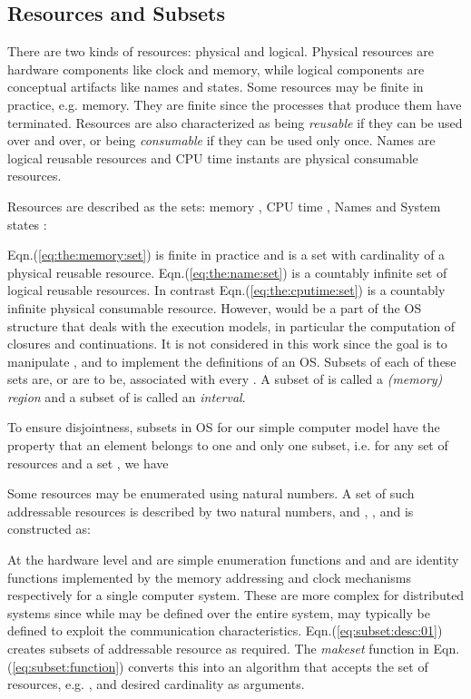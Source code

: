 \documentclass[draft]{article}
\def\eqn#1{Eqn.(\ref{#1})}
\begin{document}
\subsection{Resources and Subsets}
\label{sec:resources:subsets}

There  are two  kinds of  resources: physical  and  logical.  Physical
resources are hardware components like clock and memory, while logical
components  are  conceptual artifacts  like  names  and states.   Some
resources may  be finite  in practice, e.g.  memory.  They  are finite
since the processes that  produce them have terminated.  Resources are
also characterized as  being \emph{reusable} if they can  be used over
and over,  or being \emph{consumable} if  they can be  used only once.
Names  are  logical  reusable  resources  and CPU  time  instants  are
physical consumable resources.

Resources are described  as the sets: memory ,  CPU time , Names
 and System states :


\eqn{eq:the:memory:set}  is  finite in  practice  and  is  a set  with
cardinality      of   a   physical   reusable   resource.
\eqn{eq:the:name:set} is a countably  infinite set of logical reusable
resources.   In  contrast   \eqn{eq:the:cputime:set}  is  a  countably
infinite physical  consumable resource.  However,   would be a
part  of the OS  structure that  deals with  the execution  models, in
particular the  computation of closures and continuations.   It is not
considered in this  work since the goal is to  manipulate ,  and
 to implement  the definitions of an OS.  Subsets  of each of these
sets are, or are to be, associated  with every .  A subset of
 is called  a \emph{(memory) region} and a subset  of  is called
an \emph{interval}.

To ensure  disjointness, subsets in  OS for our simple  computer model
have the property that an element  belongs to one and only one subset,
i.e.  for any set  of resources  and a set , we
have

Some  resources may  be enumerated  using natural  numbers.  A  set   of  such  addressable  resources  is
described by  two natural  numbers,  and  , , and is constructed as:

At  the hardware  level   and 
are  simple  enumeration  functions  and    and    are
identity  functions implemented  by  the memory  addressing and  clock
mechanisms respectively for a  single computer system.  These are more
complex for distributed systems since while  may be defined over
the  entire system,   may  typically  be defined  to exploit  the
communication    characteristics.    \eqn{eq:subset:desc:01}   creates
subsets of  addressable resource  as  required.  The \emph{makeset}
function in  \eqn{eq:subset:function} converts this  into an algorithm
that accepts the set of  resources, e.g.  , and desired cardinality
 as arguments.
\end{document}
